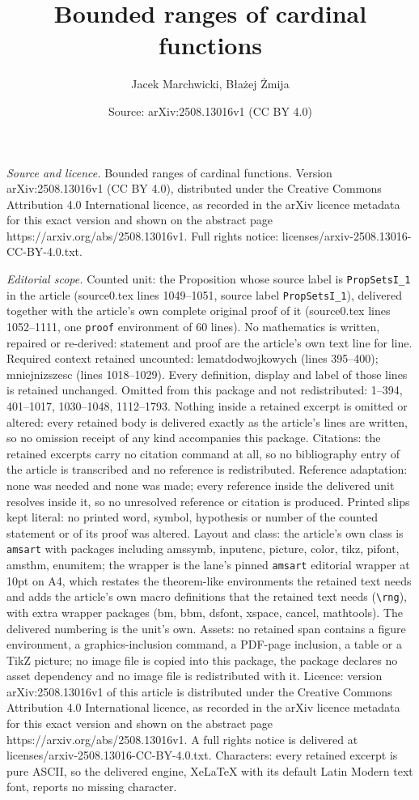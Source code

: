 \documentclass[10pt,a4paper]{amsart}
\title[Bounded ranges of cardinal functions]{Bounded ranges of cardinal functions}
\author{Jacek Marchwicki, B{\l}a\.zej \.Zmija}
\date{Source: arXiv:2508.13016v1 (CC BY 4.0)}
\begin{document}
\maketitle

\noindent\emph{Source and licence.} Bounded ranges of cardinal functions. Version arXiv:2508.13016v1 (CC BY 4.0), distributed under the Creative Commons Attribution 4.0 International licence, as recorded in the arXiv licence metadata for this exact version and shown on the abstract page https://arxiv.org/abs/2508.13016v1. Full rights notice: licenses/arxiv-2508.13016-CC-BY-4.0.txt.\par\smallskip

\noindent\textit{Editorial scope.} Counted unit: the Proposition whose source label is \texttt{PropSetsI\_1} in the article (source0.tex lines 1049--1051, source label \texttt{PropSetsI\_1}), delivered together with the article's own complete original proof of it (source0.tex lines 1052--1111, one \texttt{proof} environment of 60 lines). No mathematics is written, repaired or re-derived: statement and proof are the article's own text line for line. Required context retained uncounted: lematdodwojkowych (lines 395--400); mniejnizszesc (lines 1018--1029). Every definition, display and label of those lines is retained unchanged. Omitted from this package and not redistributed: 1--394, 401--1017, 1030--1048, 1112--1793. Nothing inside a retained excerpt is omitted or altered: every retained body is delivered exactly as the article's lines are written, so no omission receipt of any kind accompanies this package. Citations: the retained excerpts carry no citation command at all, so no bibliography entry of the article is transcribed and no reference is redistributed. Reference adaptation: none was needed and none was made; every reference inside the delivered unit resolves inside it, so no unresolved reference or citation is produced. Printed slips kept literal: no printed word, symbol, hypothesis or number of the counted statement or of its proof was altered. Layout and class: the article's own class is \texttt{amsart} with packages including amssymb, inputenc, picture, color, tikz, pifont, amsthm, enumitem; the wrapper is the lane's pinned \texttt{amsart} editorial wrapper at 10pt on A4, which restates the theorem-like environments the retained text needs and adds the article's own macro definitions that the retained text needs (\texttt{\textbackslash rng}), with extra wrapper packages (bm, bbm, dsfont, xspace, cancel, mathtools). The delivered numbering is the unit's own. Assets: no retained span contains a figure environment, a graphics-inclusion command, a PDF-page inclusion, a table or a TikZ picture; no image file is copied into this package, the package declares no asset dependency and no image file is redistributed with it. Licence: version arXiv:2508.13016v1 of this article is distributed under the Creative Commons Attribution 4.0 International licence, as recorded in the arXiv licence metadata for this exact version and shown on the abstract page https://arxiv.org/abs/2508.13016v1. A full rights notice is delivered at licenses/arxiv-2508.13016-CC-BY-4.0.txt. Characters: every retained excerpt is pure ASCII, so the delivered engine, XeLaTeX with its default Latin Modern text font, reports no missing character.
\end{document}
